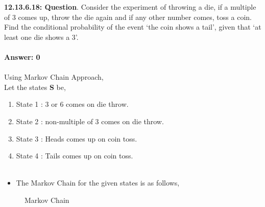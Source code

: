 \documentclass[journal,12pt,onecolumn]{IEEEtran}
\begin{document}
%
\textbf{12.13.6.18: Question}. Consider the experiment of throwing a die, if a multiple of 3 comes up, throw the die again and if any other number comes, toss a coin. Find the conditional probability
of the event ‘the coin shows a tail’, given that ‘at least one die shows a 3’.\\\\
\textbf{Answer: 0}\\\\
\solution
Using Markov Chain Approach,\\
Let the states \textbf{S} be,
\begin{enumerate}
\item State 1 : 3 or 6 comes on die throw.\\
\item State 2 : non-multiple of 3 comes on die throw.\\
\item State 3 : Heads comes up on coin toss.\\
\item State 4 : Tails comes up on coin toss.\\\\
\end{enumerate}
\begin{itemize}
\item The Markov Chain for the given states is as follows,
\end{itemize}
\begin{figure}[!ht]
	\centering
\begin{tikzpicture}[
    roundnode/.style={circle, draw=green!60, fill=green!5, very thick, minimum size=7mm},
    squarednode/.style={rectangle, draw=red!60, fill=red!5, very thick, minimum size=5mm},
    ->,>=stealth',auto,semithick,node distance=3cm,
    ]
    
	
\end{tikzpicture}
\centering
		\caption{Markov Chain}
		\label{output}
\end{figure}
\end{document}
